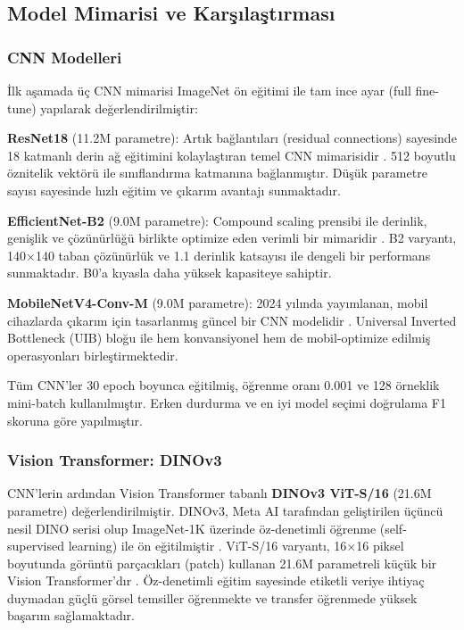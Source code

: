 \documentclass[conference]{IEEEtran}
\begin{document}
\subsection{Model Mimarisi ve Karşılaştırması}

\subsubsection{CNN Modelleri}
İlk aşamada üç CNN mimarisi ImageNet ön eğitimi ile tam ince ayar (full fine-tune) yapılarak değerlendirilmiştir: 

\textbf{ResNet18} (11.2M parametre): Artık bağlantıları (residual connections) sayesinde 18 katmanlı derin ağ eğitimini kolaylaştıran temel CNN mimarisidir \cite{he2016deep}. 512 boyutlu öznitelik vektörü ile sınıflandırma katmanına bağlanmıştır. Düşük parametre sayısı sayesinde hızlı eğitim ve çıkarım avantajı sunmaktadır.

\textbf{EfficientNet-B2} (9.0M parametre): Compound scaling prensibi ile derinlik, genişlik ve çözünürlüğü birlikte optimize eden verimli bir mimaridir \cite{tan2019efficientnet}. B2 varyantı, 140$\times$140 taban çözünürlük ve 1.1 derinlik katsayısı ile dengeli bir performans sunmaktadır. B0'a kıyasla daha yüksek kapasiteye sahiptir.

\textbf{MobileNetV4-Conv-M} (9.0M parametre): 2024 yılında yayımlanan, mobil cihazlarda çıkarım için tasarlanmış güncel bir CNN modelidir \cite{qin2024mobilenetv4}. Universal Inverted Bottleneck (UIB) bloğu ile hem konvansiyonel hem de mobil-optimize edilmiş operasyonları birleştirmektedir.

Tüm CNN'ler 30 epoch boyunca eğitilmiş, öğrenme oranı 0.001 ve 128 örneklik mini-batch kullanılmıştır. Erken durdurma ve en iyi model seçimi doğrulama F1 skoruna göre yapılmıştır.

\subsubsection{Vision Transformer: DINOv3}
CNN'lerin ardından Vision Transformer tabanlı \textbf{DINOv3 ViT-S/16} (21.6M parametre) değerlendirilmiştir. DINOv3, Meta AI tarafından geliştirilen üçüncü nesil DINO serisi olup ImageNet-1K üzerinde öz-denetimli öğrenme (self-supervised learning) ile ön eğitilmiştir \cite{simeoni2025dinov3}. ViT-S/16 varyantı, 16$\times$16 piksel boyutunda görüntü parçacıkları (patch) kullanan 21.6M parametreli küçük bir Vision Transformer'dır \cite{dosovitskiy2020image}. Öz-denetimli eğitim sayesinde etiketli veriye ihtiyaç duymadan güçlü görsel temsiller öğrenmekte ve transfer öğrenmede yüksek başarım sağlamaktadır.
\end{document}
